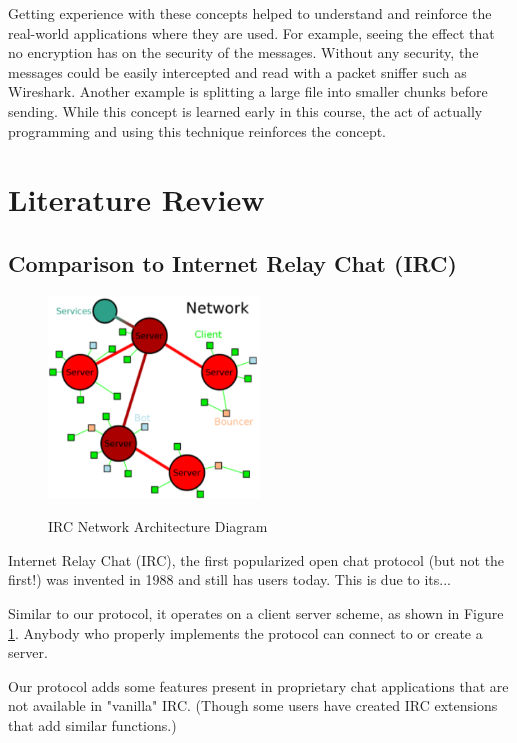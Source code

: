 \documentclass{article}
\begin{document}
Getting experience with these concepts helped to understand and reinforce the real-world applications where they are used. For example, seeing the effect that no encryption has on the security of the messages. Without any security, the messages could be easily intercepted and read with a packet sniffer such as Wireshark. Another example is splitting a large file into smaller chunks before sending. While this concept is learned early in this course, the act of actually programming and using this technique reinforces the concept.

\section{Literature Review}

\subsection{Comparison to Internet Relay Chat (IRC)}

\begin{figure}[h]
\caption{IRC Network Architecture Diagram}
\centering
\includegraphics[width=0.5\textwidth]{media/Network.PNG}
\label{Network Architecture}
\end{figure}

Internet Relay Chat (IRC), the first popularized open chat protocol (but not the first!) was invented in 1988 and still has users today. This is due to its...

Similar to our protocol, it operates on a client server scheme, as shown in Figure \ref{Network Architecture}. Anybody who properly implements the protocol can connect to or create a server. 

Our protocol adds some features present in proprietary chat applications that are not available in "vanilla" IRC. (Though some users have created IRC extensions that add similar functions.)
\end{document}
